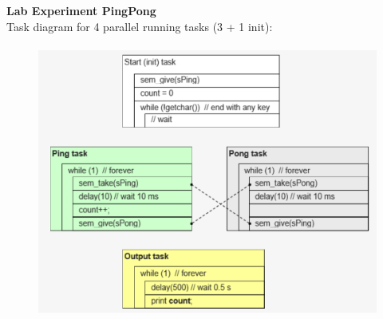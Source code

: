 {\rot\bf Lab Experiment PingPong}\\

Task diagram for 4 parallel running tasks (3 + 1 init):\\

 	\begin{figure}[h]
    \centering
    \includegraphics[width=13cm, height=9cm]{Images/image133.png}
    \label{fig:Fig 83}
    \end{figure}

